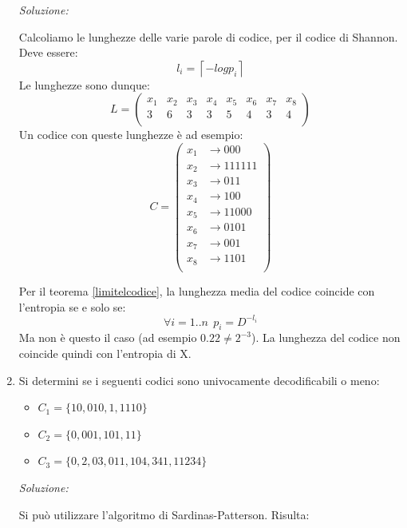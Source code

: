 \begin{enumerate}
       \textit{Soluzione:}

       \noindent
       Calcoliamo le lunghezze delle varie parole di codice, per il codice di Shannon. Deve essere:
       \[
        l_i=\left \lceil -log p_i \right \rceil
       \]
       Le lunghezze sono dunque:
       \[ L = \left(
        \begin{array}{cccccccc}
           x_1  & x_2  & x_3  & x_4  & x_5  & x_6  & x_7  & x_8 \\
           3    & 6    & 3    & 3    & 5    & 4    & 3    & 4 \\
        \end{array} \right)
       \]
       Un codice con queste lunghezze è ad esempio:
       \[ C = \left(
        \begin{array}{cl}
           x_1  & \to 000 \\
           x_2  & \to 111111 \\
           x_3  & \to 011 \\
           x_4  & \to 100 \\
           x_5  & \to 11000 \\
           x_6  & \to 0101 \\
           x_7  & \to 001  \\
           x_8  & \to 1101 \\
        \end{array} \right)
       \]

       Per il teorema \ref{limitelcodice}, la lunghezza media del codice coincide con l'entropia se e solo se:
       \[
        \forall i=1..n  \ \ p_i=D^{-l_i}
       \]
       Ma non è questo il caso (ad esempio $0.22\ne2^{-3}$). La lunghezza del codice non coincide quindi con 
       l'entropia di X.
       \bigskip

 \item Si determini se i seguenti codici sono univocamente decodificabili o meno:
       \begin{itemize}
        \item $C_1=\{10,010,1,1110\}$
        \item $C_2=\{0,001,101,11\}$
        \item $C_3=\{0,2,03,011,104,341,11234\}$
       \end{itemize}
       \bigskip
       \bigskip

       \textit{Soluzione:}

       \noindent
       Si può utilizzare l'algoritmo di Sardinas-Patterson. Risulta:
       \newpage


\end{enumerate}
